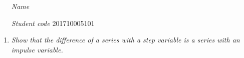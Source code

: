 \documentclass[fleqn]{article}
\begin{document}
 \vspace{0.3cm}
   \begin{itemize}[leftmargin=6.25cm, labelsep=0.5cm]

     \item[\textit{Name}]  %
     \item[\textit{Student code}] 201710005101 %

   \end{itemize}
\vspace{0.3cm}

\begin{enumerate}
    \item \textit{Show that the difference of a series with a step variable is a series with an impulse variable.}
    

\end{enumerate}
\end{document}
